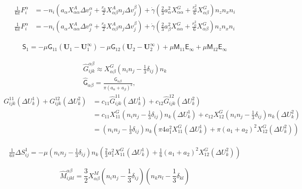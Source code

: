 \documentclass[12pt]{article}
\newcommand{\tens}[1]{\bm{\mathsf{#1}}}
\begin{document}
\begin{align}
\frac{1}{6\pi} F^{\alpha}_i
&= -n_i \left(
a_{\alpha} X_{\alpha\alpha}^{A} \Delta v^{\alpha}_j
+ \frac{r_0}{2} 
X_{\alpha\beta}^{A} n_j \Delta v^{\beta}_j
\right) 
 +
\dot{\gamma}
\left( \frac{2}{3} a_{\alpha}^2   X_{\alpha\alpha}^{G} 
 + \frac{r_0^2}{6} X_{\alpha\beta}^{G} \right)n_z n_x  n_i \\
\frac{1}{6\pi} F^{\alpha}_i
&= -n_i \left(
a_{\alpha} X_{\alpha\alpha}^{A} \Delta v^{\alpha}_j
+ \frac{r_0}{2} 
X_{\alpha\beta}^{A} n_j \Delta v^{\beta}_j
\right)
 + 
\dot{\gamma}
\left( \frac{2}{3} a_{\beta}^2 X_{\alpha\alpha}^{G}
  + \frac{r_0^2}{6} X_{\alpha\beta}^{G}\right)
n_z n_x n_i
\end{align}

\begin{align}
\tens{S}_1
 = 
- \mu \tens{G}_{11} (\bm{U}_1-\bm{U}_1^{\infty})
- \mu \tens{G}_{12} (\bm{U}_2-\bm{U}_2^{\infty})
+ \mu \tens{M}_{11} \tens{E}_{\infty}
+ \mu \tens{M}_{12} \tens{E}_{\infty}
\end{align}

\begin{gather}
 \hat{G}_{ijk}^{\alpha \beta}
\approx 
X_{\alpha\beta}^{G} 
\left(n_i n_j - \frac{1}{3}\delta_{ij}\right)n_k\\
 \hat{\tens{G}}_{\alpha\beta}
= \frac{\tens{G}_{\alpha\beta}}{\pi(a_{\alpha} + a_{\beta})^2},
\end{gather}
\begin{align}
 G^{11}_{ijk} (\Delta U^{1}_k)
+ G^{12}_{ijk} (\Delta U^{2}_k)
&= c_{11} \hat{G}^{11}_{ijk} (\Delta U^{1}_k)
+ c_{12} \hat{G}^{12}_{ijk} (\Delta U^{2}_k) \\
&= c_{11} X_{11}^{G}(n_i n_j - \frac{1}{3}\delta_{ij}) n_k (\Delta U^{1}_k)
+ c_{12} X_{12}^{G}(n_i n_j - \frac{1}{3}\delta_{ij}) n_k  (\Delta U^{2}_k) \\
&=
(n_i n_j - \frac{1}{3}\delta_{ij}) n_k
\left(
\pi 4 a_1^2 X_{11}^{G} (\Delta U^{1}_k)
+ 
\pi (a_1+a_2)^2 X_{12}^{G} (\Delta U^{2}_k)
\right)
\end{align}

\begin{align}
\frac{1}{6\pi} \Delta S^{1}_{ij}
= - \mu 
(n_i n_j - \frac{1}{3}\delta_{ij}) n_k
\left(
 \frac{2}{3} a_1^2 X_{11}^{G} (\Delta U^{1}_k)
+ 
\frac{1}{6}
 (a_1+a_2)^2 X_{12}^{G} (\Delta U^{2}_k)
\right)
\end{align}



\begin{equation}
 \hat{M}_{ijkl}^{\alpha\beta}
=  \frac{3}{2}
X_{\alpha\beta}^{M}
 \left(n_i n_j
 - \frac{1}{3} \delta_{ij}
\right)
 \left(n_k n_l
 - \frac{1}{3} \delta_{kl}
\right)  
\end{equation}
\end{document}
